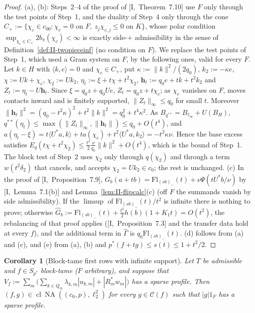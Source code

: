 \documentclass[10pt]{amsart}
\newtheorem{corollary}[theorem]{Corollary}
\theoremstyle{definition}
\theoremstyle{remark}
\newcommand{\NA}{\operatorname{NA}}
\newcommand{\Cset}{\mathcal C}
\newcommand{\cl}{\operatorname{cl}}
\newcommand{\ip}[2]{\langle #1,#2\rangle}
\begin{document}
\begin{proof}
(a), (b): Steps~2--4 of the proof of [I,~Theorem~7.10] use $F$ only through
the test points of Step~1, and the duality of Step~4 only through the cone
$C_+:=\{\chi_c\in c_{00}:\chi_c=0\text{ on }F,\ z_j\chi_{c,j}\le0\text{ on }
K\}$, whose polar condition $\sup_{\chi_c\in C_+}2b_\pi(\chi_c)<\infty$ is
exactly side-$+$ admissibility in the sense of
Definition~\ref{def:II-twopieceinf} (no condition on $F$).  We replace the
test points of Step~1, which used a Gram system on $F$, by the following
ones, valid for every $F$.  Let $k\in H$ with $\ip ke=0$ and $\chi_c\in C_+$,
put $\kappa:=\|k\|^2/(2q_0)$, $k_2:=-\kappa e$, $\chi:=Uk+\chi_c$,
$\chi_2:=Uk_2$, $\eta_t:=\xi+t\chi+t^2\chi_2$, $\mathbf h_t:=q_0e+tk+t^2k_2$
and $Z_t:=\eta_t-U\mathbf h_t$.  Since $\xi=q_0z+q_0Ue$, $Z_t=q_0z+t\chi_c$;
as $\chi_c$ vanishes on $F$, moves contacts inward and is finitely
supported, $\|Z_t\|_\infty\le q_0$ for small $t$.  Moreover
$\|\mathbf h_t\|^2=(q_0-t^2\kappa)^2+t^2\|k\|^2=q_0^2+t^4\kappa^2$.  As
$B_{q^{**}}=B_{\ell_\infty}+U(B_H)$, $q^{**}(\eta_t)\le\max(\|Z_t\|_\infty,
\|\mathbf h_t\|)\le q_0+O(t^4)$, and $a(\eta_t-\xi)=t\ip{U^*a}k+ta(\chi_c)+
t^2\ip{U^*a}{k_2}=-t^2\kappa\nu$.  Hence the base excess satisfies
$E_q(t\chi+t^2\chi_2)\le\frac{t^2}2\frac\nu{q_0}\|k\|^2+O(t^4)$, which is
the bound of Step~1.  The block test of Step~2 uses $\chi_2$ only through
$q(\chi_2)$ and through a term $w(t^2\delta_2)$ that cancels, and accepts
$\chi_2=Uk_2\in c_0$; the rest is unchanged.
(c) In the proof of [I,~Proposition~7.9],
$G_b(a+tb)=\mathrm{Fl}_{(sb)_-}(t)+\nu\Psi(tU^*b/\nu)$ by [I,~Lemma~7.1(b)] and
Lemma~\ref{lem:II-flipcalc}(c) (off $F$ the summands vanish by side
admissibility).  If the $\limsup$ of $\mathrm{Fl}_{(sb)_-}(t)/t^2$ is infinite
there is nothing to prove; otherwise $\hat G_b:=\mathrm{Fl}_{(sb)_-}(t)+
\frac{t^2}2h(b)(1+K_1t)=O(t^2)$, the rebalancing of that proof applies
([I,~Proposition~7.3] and the transfer data hold at every $f$), and the
additional term in $\hat\Gamma$ is $q_0\mathrm{Fl}_{(sb)_-}(t)$.  (d) follows
from (a) and (c), and (e) from (a), (b) and $p^*(f+tg)\le s(t)\le1+t^2/2$.
\end{proof}

\begin{corollary}[Block-tame first rows with infinite support]
\label{cor:II-BTinf}
Let $T$ be admissible and $f\in S_{p^*}$ block-tame \textup{(}$F$
arbitrary\textup{)}, and suppose that
$V_f:=\sum_m\big(\sum_{k\in Q_m}\lambda_{k,m}|u_{k,m}|+|R_m^*w_m|\big)$ has a
sparse profile.  Then $(f,g)\in\cl\NA((c_0,p),\ell_2^2)$ for every
$g\in\Cset(f)$ such that $|g|1_F$ has a sparse profile.
\end{corollary}
\end{document}
